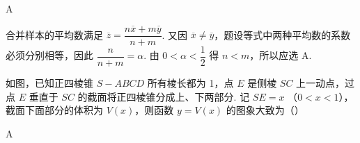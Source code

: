 \begin{answer}
A
\end{answer}

\begin{solution}
合并样本的平均数满足
\(\overline z=\dfrac{n\overline x+m\overline y}{n+m}\).
又因 \(\overline x\neq\overline y\)，题设等式中两种平均数的系数必须分别相等，因此
\(\dfrac n{n+m}=\alpha\).
由 \(0<\alpha<\dfrac12\) 得 \(n<m\)，所以应选 A.
\end{solution}

\begin{problem}
如图，已知正四棱锥 \(S - ABCD\) 所有棱长都为 1，点 \(E\) 是侧棱 \(SC\) 上一动点，过点 \(E\) 垂直于 \(SC\) 的截面将正四棱锥分成上、下两部分. 记 \(SE = x\) （\(0 < x < 1\)），截面下面部分的体积为 \(V(x)\)，则函数 \(y = V(x)\) 的图象大致为（\quad）


    {}
    {}
    {}
\end{problem}

\begin{answer}
A
\end{answer}

